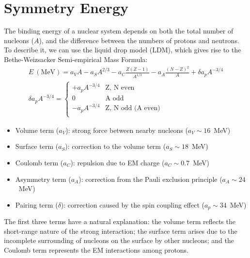 \section{Symmetry Energy} 
The binding energy of a nuclear system depends on both the total number of nucleons ($A$),
and the difference between the numbers of protons and neutrons. To describe it,
we can use the liquid drop model (LDM), which gives rise to the Bethe-Weizsacker Semi-empirical Mass Formula:
\begin{equation}
    \begin{gathered}
	E\ (\mathrm{MeV}) = 
            a_V A - a_S A^{2/3}  - a_C\frac{Z(Z-1)}{A^{1/3}} - a_A\frac{(N-Z)^2}{A} + \delta a_p A^{-3/4} \\
	\delta a_p A^{-3/4} = 
	    \begin{cases}
		+a_p A^{-3/4}	& \text{Z, N even} \\
		0		& \text{A odd}	\\
		-a_p A^{-3/4}	& \text{Z, N odd (A even)} \\
	    \end{cases}
    \end{gathered}
    \label{eq:mass-formula}
\end{equation}

\begin{itemize}
    \item Volume term ($a_V$): strong force between nearby nucleons ($a_V \sim 16$~MeV)
    \item Surface term ($a_S$): correction to the volume term ($a_S \sim 18$~MeV)
    \item Coulomb term ($a_C$): repulsion due to EM charge ($a_C \sim 0.7$~MeV)
    \item Asymmetry term ($a_A$): correction from the Pauli exclusion principle ($a_A \sim 24$~MeV)
    \item Pairing term ($\delta$): correction caused by the spin coupling effect 
	($a_p \sim 34$~MeV)
\end{itemize}

The first three terms have a natural explanation:
the volume term reflects the short-range nature of the strong interaction; the
surface term arises due to the incomplete surrounding of nucleons on the surface 
by other nucleons; and the Coulomb term represents the EM interactions among protons. 

